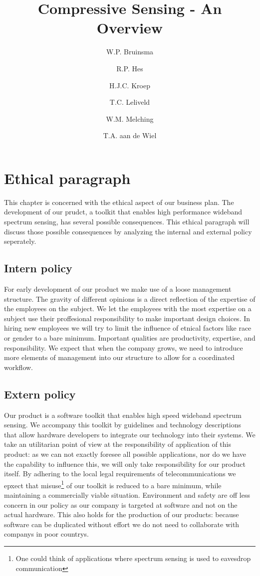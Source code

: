 \documentclass[a4paper, openany, oneside]{memoir}
\title{Compressive Sensing - An Overview}
\author{W.P. Bruinsma \and R.P. Hes \and H.J.C. Kroep \and T.C. Leliveld \and W.M. Melching \and T.A. aan de Wiel}
\begin{document}
\section{Ethical paragraph}
This chapter is concerned with the ethical aspect of our business plan. The development of our prudct, a toolkit that enables high performance wideband spectrum sensing, has several possible consequences. This ethical paragraph will discuss those possible consequences by analyzing the internal and external policy seperately.

\subsection{Intern policy}

For early development of our product we make use of a loose management structure. The gravity of different opinions is a direct reflection of the expertise of the employees on the subject. We let the employees with the most expertise on a subject use their proffesional responsibility to make important design choices. In hiring new employees we will try to limit the influence of etnical factors like race or gender to a bare minimum. Important qualities are productivity, expertise, and responsibility. We expect that when the company grows, we need to introduce more elements of management into our structure to allow for a coordinated workflow.


\subsection{Extern policy}

Our product is a software toolkit that enables high speed wideband spectrum sensing. We accompany this toolkit by guidelines and technology descriptions that allow hardware developers to integrate our technology into their systems. We take an utilitarian point of view at the responsibility of application of this product: as we can not exactly foresee all possible applications, nor do we have the capability to influence this, we will only take responsibility for our product itself. By adhering to the local legal requirements of telecommunications we epxect that misuse\footnote{One could think of applications where spectrum sensing is used to eavesdrop communication} of our toolkit is reduced to a bare minimum, while maintaining a commercially viable situation. Environment and safety are off less concern in our policy as our company is targeted at software and not on the actual hardware. This also holds for the production of our products: because software can be duplicated without effort we do not need to collaborate with companys in poor countrys.
\end{document}
